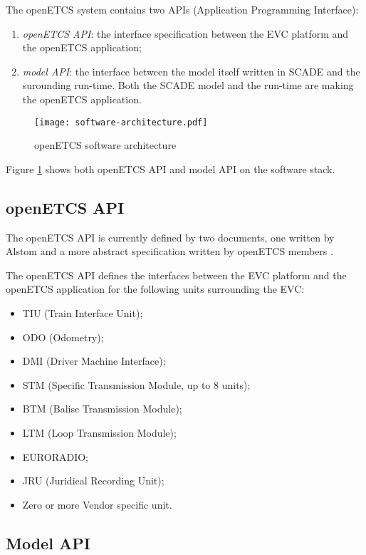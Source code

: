 
The openETCS system contains two APIs (Application Programming
Interface):
\begin{enumerate}
\item \emph{openETCS API}: the interface specification between the
EVC platform and the openETCS application;
\item \emph{model API}: the interface between the model itself written in
SCADE and the surounding run-time. Both the SCADE model and the
run-time are making the openETCS application.
\end{enumerate}

\begin{figure}[h]
\centering
\texttt{[image: software-architecture.pdf]}
\caption{openETCS software architecture}
\label{fig:software-architecture}
\end{figure}

Figure \ref{fig:software-architecture} shows both openETCS API and
model API on the software stack.

\subsection{openETCS API}

The openETCS API is currently defined by two documents, one written by
Alstom \cite{alstom-api} and a more abstract specification written by
openETCS members \cite{openetcs-api}.

The openETCS API defines the interfaces between the EVC platform and
the openETCS application for the following units surrounding the EVC:
\begin{itemize}
\item TIU (Train Interface Unit);
\item ODO (Odometry);
\item DMI (Driver Machine Interface);
\item STM (Specific Transmission Module, up to 8 units);
\item BTM (Balise Transmission Module);
\item LTM (Loop Transmission Module);
\item EURORADIO;
\item JRU (Juridical Recording Unit);
\item Zero or more Vendor specific unit.
\end{itemize}


\subsection{Model API}

